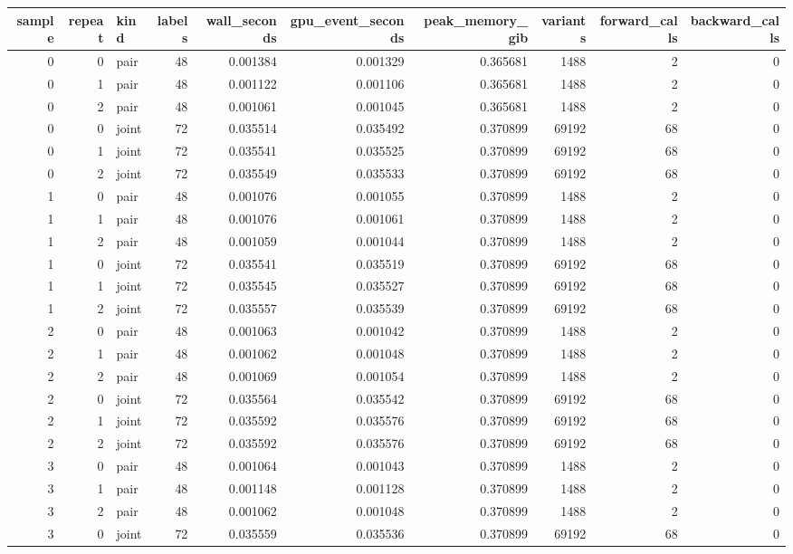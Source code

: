 \begin{tabular}{rrlrrrrrrr}
\toprule
sample & repeat & kind & labels & wall_seconds & gpu_event_seconds & peak_memory_gib & variants & forward_calls & backward_calls \\
\midrule
0 & 0 & pair & 48 & 0.001384 & 0.001329 & 0.365681 & 1488 & 2 & 0 \\
0 & 1 & pair & 48 & 0.001122 & 0.001106 & 0.365681 & 1488 & 2 & 0 \\
0 & 2 & pair & 48 & 0.001061 & 0.001045 & 0.365681 & 1488 & 2 & 0 \\
0 & 0 & joint & 72 & 0.035514 & 0.035492 & 0.370899 & 69192 & 68 & 0 \\
0 & 1 & joint & 72 & 0.035541 & 0.035525 & 0.370899 & 69192 & 68 & 0 \\
0 & 2 & joint & 72 & 0.035549 & 0.035533 & 0.370899 & 69192 & 68 & 0 \\
1 & 0 & pair & 48 & 0.001076 & 0.001055 & 0.370899 & 1488 & 2 & 0 \\
1 & 1 & pair & 48 & 0.001076 & 0.001061 & 0.370899 & 1488 & 2 & 0 \\
1 & 2 & pair & 48 & 0.001059 & 0.001044 & 0.370899 & 1488 & 2 & 0 \\
1 & 0 & joint & 72 & 0.035541 & 0.035519 & 0.370899 & 69192 & 68 & 0 \\
1 & 1 & joint & 72 & 0.035545 & 0.035527 & 0.370899 & 69192 & 68 & 0 \\
1 & 2 & joint & 72 & 0.035557 & 0.035539 & 0.370899 & 69192 & 68 & 0 \\
2 & 0 & pair & 48 & 0.001063 & 0.001042 & 0.370899 & 1488 & 2 & 0 \\
2 & 1 & pair & 48 & 0.001062 & 0.001048 & 0.370899 & 1488 & 2 & 0 \\
2 & 2 & pair & 48 & 0.001069 & 0.001054 & 0.370899 & 1488 & 2 & 0 \\
2 & 0 & joint & 72 & 0.035564 & 0.035542 & 0.370899 & 69192 & 68 & 0 \\
2 & 1 & joint & 72 & 0.035592 & 0.035576 & 0.370899 & 69192 & 68 & 0 \\
2 & 2 & joint & 72 & 0.035592 & 0.035576 & 0.370899 & 69192 & 68 & 0 \\
3 & 0 & pair & 48 & 0.001064 & 0.001043 & 0.370899 & 1488 & 2 & 0 \\
3 & 1 & pair & 48 & 0.001148 & 0.001128 & 0.370899 & 1488 & 2 & 0 \\
3 & 2 & pair & 48 & 0.001062 & 0.001048 & 0.370899 & 1488 & 2 & 0 \\
3 & 0 & joint & 72 & 0.035559 & 0.035536 & 0.370899 & 69192 & 68 & 0 \\

\end{tabular}

